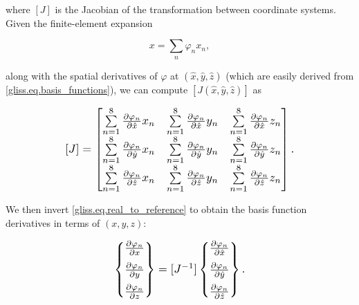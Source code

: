 \noindent
where $[J]$ is the Jacobian of the transformation between coordinate systems.  
Given the finite-element expansion

\begin{equation}
   x = \sum\limits_{n}{{{\varphi }_{n}}{{x}_{n}}},
\end{equation}

\noindent
along with the spatial derivatives of $\varphi$ at $(\hat{x},\hat{y},\hat{z})$
(which are easily derived from \eqref{gliss.eq.basis_functions}),
we can compute $[J(\hat{x},\hat{y},\hat{z})]$ as

\begin{equation}
  \label{gliss.eq.Jacobian_eval}
  \scalebox{1.2}{
  $
        [J]=\left[ \begin{matrix}
            \sum\limits_{n=1}^{8}{\frac{\partial {{\varphi }_{n}}}{\partial \hat{x}}{{x}_{n}}} & \sum\limits_{n=1}^{8}{\frac{\partial {{\varphi }_{n}}}{\partial \hat{x}}{{y}_{n}}} & \sum\limits_{n=1}^{8}{\frac{\partial {{\varphi }_{n}}}{\partial \hat{x}}{{z}_{n}}}  \\[6pt]
            \sum\limits_{n=1}^{8}{\frac{\partial {{\varphi }_{n}}}{\partial \hat{y}}{{x}_{n}}} & \sum\limits_{n=1}^{8}{\frac{\partial {{\varphi }_{n}}}{\partial \hat{y}}{{y}_{n}}} & \sum\limits_{n=1}^{8}{\frac{\partial {{\varphi }_{n}}}{\partial \hat{y}}{{z}_{n}}}  \\[6pt]
            \sum\limits_{n=1}^{8}{\frac{\partial {{\varphi }_{n}}}{\partial \hat{z}}{{x}_{n}}} & \sum\limits_{n=1}^{8}{\frac{\partial {{\varphi }_{n}}}{\partial \hat{z}}{{y}_{n}}} & \sum\limits_{n=1}^{8}{\frac{\partial {{\varphi }_{n}}}{\partial \hat{z}}{{z}_{n}}}  \\
          \end{matrix} \right].
        $
        }
\end{equation}

\noindent
We then invert \eqref{gliss.eq.real_to_reference} to obtain the 
basis function derivatives in terms of $(x,y,z)$:

\begin{equation}
  \label{gliss.eq.reference_to_real}
  \scalebox{1.2}{
    $
  \left\{ \begin{matrix}
     \frac{\partial {{\varphi }_{n}}}{\partial x}  \\[6pt]
     \frac{\partial {{\varphi }_{n}}}{\partial y}  \\[6pt]
     \frac{\partial {{\varphi }_{n}}}{\partial z}  \\
  \end{matrix} \right\} =
          [J^{-1}]  \left\{ \begin{matrix}
    \frac{\partial {{\varphi }_{n}}}{\partial \hat{x}}  \\[6pt]
    \frac{\partial {{\varphi }_{n}}}{\partial \hat{y}}  \\[6pt]
    \frac{\partial {{\varphi }_{n}}}{\partial \hat{z}}  \\
  \end{matrix} \right\}. 
          $
          }
\end{equation}

